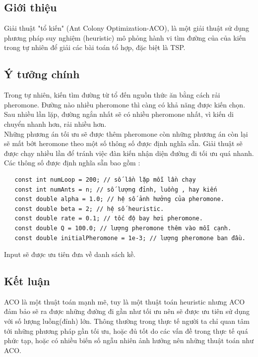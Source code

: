 \documentclass[11pt,a4paper,openany]{report}
\begin{document}
\subsection{Giới thiệu}
Giải thuật "tổ kiến" (Ant Colony Optimization-ACO), là một giải thuật sử dụng phương pháp
suy nghiệm (heuristic) mô phỏng hành vi tìm đường của của kiến trong tự nhiên để 
giải các bài toán tổ hợp, đặc biệt là TSP. 
\subsection{Ý tưởng chính}
Trong tự nhiên, kiến tìm đường từ tổ đến nguồn thức ăn bằng cách rải pheromone. Đường nào nhiều pheromone thì càng có khả năng được kiến chọn. Sau nhiều lần lặp, đường ngắn nhất sẽ có nhiều pheromone nhất, vì kiến di chuyển nhanh hơn, rải nhiều hơn.\\[2pt]
Những phương án tối ưu sẽ được thêm pheromone còn những phương án còn lại sẽ mất bớt 
heromone theo một số thông số được định nghĩa sẵn.
Giải thuật sẽ được chạy nhiều lần để tránh việc đàn kiến nhận diện đường đi tối ưu quá nhanh.\\[2pt]
Các thông số được định nghĩa sẵn bao gồm :

\begin{verbatim}
   const int numLoop = 200; // số lần lặp mỗi lần chạy
   const int numAnts = n; // số lượng đỉnh, luồng , hay kiến
   const double alpha = 1.0; // hệ số ảnh hưởng của pheromone.
   const double beta = 2; // hệ số heuristic. 
   const double rate = 0.1; // tốc độ bay hơi pheromone.
   const double Q = 100.0; // lượng pheromone thêm vào mỗi cạnh.
   const double initialPheromone = 1e-3; // lượng pheromone ban đầu.
\end{verbatim}
Input sẽ được ưu tiên đưa về danh sách kề. 
\subsection{Kết luận} 
ACO là một thuật toán mạnh mẽ, tuy là một thuật toán heuristic nhưng ACO đảm bảo
sẽ ra được những đường đi gần như tối ưu nên sẽ được ưu tiên sử dụng với số lượng luồng(đỉnh) lớn.
Thông thường trong thực tế người ta chỉ quan tâm tới những phương pháp gần tối ưu, hoặc đủ tốt do
các vấn đề trong thực tế quá phức tạp, hoặc có nhiều biến số ngẫu nhiên ảnh hưởng nên những thuật toán 
như ACO.
\end{document}
